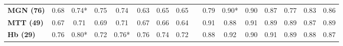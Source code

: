 \begin{table}[]
{\begin{tabular}{lccccccccccccccc}
\rowcolor[HTML]{FFFFFF} \cellcolor[HTML]{D9D9D9}\textbf{MGN (76)} & 0.68 & 0.74* & 0.75 & 0.74  & 0.63 & 0.65  & 0.65 & & 0.79 & 0.90* & 0.90 & 0.87 & 0.77 & 0.83  & 0.86 \\
\rowcolor[HTML]{FFFFFF} \cellcolor[HTML]{D9D9D9}\textbf{MTT (49)} & 0.67 & 0.71  & 0.69 & 0.71  & 0.67 & 0.66  & 0.64 & & 0.91 & 0.88  & 0.91 & 0.89 & 0.89 & 0.87  & 0.89 \\
\rowcolor[HTML]{FFFFFF} \cellcolor[HTML]{D9D9D9}\textbf{Hb  (29)} & 0.76 & 0.80* & 0.72 & 0.76* & 0.76 & 0.74  & 0.72 & & 0.88 & 0.92  & 0.90 & 0.91 & 0.89 & 0.88  & 0.87
\end{tabular}%
}\label{Thalamus.Table.3.Comparison.THOMAS}
\end{table}

\begin{table}[]
\caption{Comparison of mean Dice and VSI for FreeSurfer versus proposed method for CSFn-MPRAGE data (median volumes in mm3 are shown in parentheses and nuclei with  \textless{}200 mm3 shaded, red bold indicates \textgreater{}20\% change)}
\end{table}
